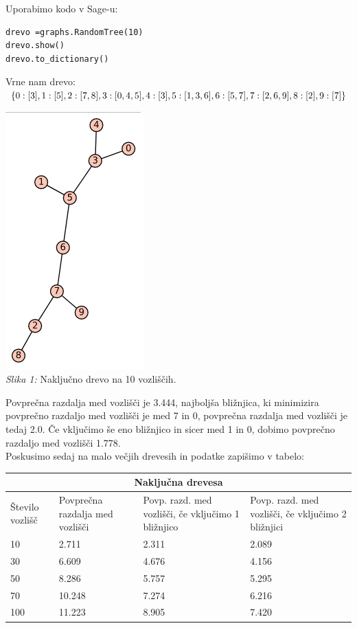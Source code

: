 \documentclass[a4paper,10pt]{article}
\begin{document}
Uporabimo kodo v Sage-u:
\begin{verbatim}
drevo =graphs.RandomTree(10)
drevo.show()
drevo.to_dictionary()
\end{verbatim}
Vrne nam drevo:$ \lbrace 0: [3], 1: [5], 2: [7, 8], 3: [0, 4, 5], 4: [3], \\ 5: [1, 3, 6], 6: [5, 7], 7: [2, 6, 9], 8: [2], 9: [7] \rbrace$
\begin{center}
\includegraphics[scale = 0.6]{graf1}\\ 
\scriptsize{\textit{Slika 1: } Naključno drevo na 10 vozliščih.}
\end{center}
Povprečna razdalja med vozlišči je 3.444, najboljša bližnjica, ki minimizira povprečno razdaljo med vozlišči je med 7 in 0, povprečna razdalja med vozlišči je tedaj 2.0. Če vključimo še eno bližnjico in sicer med 1 in 0, dobimo povprečno razdaljo med vozlišči 1.778.
\\[0.5cm]
Poskusimo sedaj na malo večjih drevesih in podatke zapišimo v tabelo:
\\[0.5cm]
\begin{tabular}{ |p{3cm}||p{3cm}|p{3cm}|p{3cm}|  }
 \hline
 \multicolumn{4}{|c|}{Naključna drevesa} \\
 \hline
 Število vozlišč& Povprečna razdalja med vozlišči &Povp. razd. med vozlišči, če vključimo 1 bližnjico&Povp. razd. med vozlišči, če vključimo 2 bližnjici\\
 \hline
 10   & 2.711    &2.311&   2.089\\
 30 &6.609 & 4.676& 4.156\\
 50    &8.286 & 5.757& 5.295\\
 70&10.248&7.274&6.216\\
 100&  11.223  & 8.905&7.420\\
 
 \hline
\end{tabular}
\end{document}
